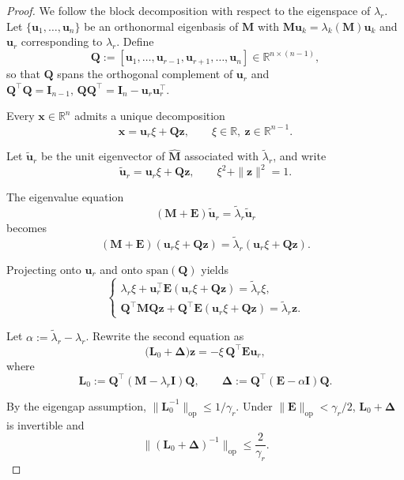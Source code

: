 \documentclass[10pt,a4paper]{amsart}
\newcommand{\op}{\mathrm{op}}
\begin{document}
\begin{proof}
We follow the block decomposition with respect to the eigenspace of $\lambda_r$.
Let $\{\mathbf{u}_1,\dots,\mathbf{u}_n\}$ be an orthonormal eigenbasis of $\mathbf{M}$ with
$\mathbf{M}\mathbf{u}_k=\lambda_k(\mathbf{M})\mathbf{u}_k$ and $\mathbf{u}_r$ corresponding to $\lambda_r$.
Define
\[
\mathbf{Q}
:=
[\mathbf{u}_1,\dots,\mathbf{u}_{r-1},\mathbf{u}_{r+1},\dots,\mathbf{u}_n]
\in \mathbb{R}^{n\times(n-1)},
\]
so that $\mathbf{Q}$ spans the orthogonal complement of $\mathbf{u}_r$ and
\(
\mathbf{Q}^\top \mathbf{Q}=\mathbf{I}_{n-1},
\,
\mathbf{Q}\mathbf{Q}^\top=\mathbf{I}_n-\mathbf{u}_r\mathbf{u}_r^\top.
\)

Every $\mathbf{x}\in\mathbb{R}^n$ admits a unique decomposition
\[
\mathbf{x}=\mathbf{u}_r\xi+\mathbf{Q}\mathbf{z},
\qquad
\xi\in\mathbb{R},\ \mathbf{z}\in\mathbb{R}^{n-1}.
\]

Let $\widetilde{\mathbf{u}}_r$ be the unit eigenvector of $\widehat{\mathbf{M}}$
associated with $\widetilde{\lambda}_r$, and write
\[
\widetilde{\mathbf{u}}_r=\mathbf{u}_r\xi+\mathbf{Q}\mathbf{z},
\qquad
\xi^2+\|\mathbf{z}\|^2=1.
\]

The eigenvalue equation
\[
(\mathbf{M}+\mathbf{E})\widetilde{\mathbf{u}}_r
=
\widetilde{\lambda}_r \widetilde{\mathbf{u}}_r
\]
becomes
\[
(\mathbf{M}+\mathbf{E})(\mathbf{u}_r\xi+\mathbf{Q}\mathbf{z})
=
\widetilde{\lambda}_r(\mathbf{u}_r\xi+\mathbf{Q}\mathbf{z}).
\]

Projecting onto $\mathbf{u}_r$ and onto $\text{span}(\mathbf{Q})$ yields
\[
\begin{cases}
\lambda_r\xi + \mathbf{u}_r^\top \mathbf{E}(\mathbf{u}_r\xi+\mathbf{Q}\mathbf{z})
= \widetilde{\lambda}_r \xi, \\[0.3em]
\mathbf{Q}^\top \mathbf{M}\mathbf{Q}\mathbf{z}
+ \mathbf{Q}^\top \mathbf{E}(\mathbf{u}_r\xi+\mathbf{Q}\mathbf{z})
= \widetilde{\lambda}_r \mathbf{z}.
\end{cases}
\]

Let $\alpha:=\widetilde{\lambda}_r-\lambda_r$.
Rewrite the second equation as
\[
\bigl(\mathbf{L}_0 + \mathbf{\Delta}\bigr)\mathbf{z}
=
-\xi\,\mathbf{Q}^\top\mathbf{E}\mathbf{u}_r,
\]
where
\[
\mathbf{L}_0 := \mathbf{Q}^\top(\mathbf{M}-\lambda_r\mathbf{I})\mathbf{Q},
\qquad
\mathbf{\Delta} := \mathbf{Q}^\top(\mathbf{E}-\alpha\mathbf{I})\mathbf{Q}.
\]

By the eigengap assumption, $\|\mathbf{L}_0^{-1}\|_{\op}\le 1/\gamma_r$.
Under $\|\mathbf{E}\|_{\op}<\gamma_r/2$,
$\mathbf{L}_0+\mathbf{\Delta}$ is invertible and
\[
\|(\mathbf{L}_0+\mathbf{\Delta})^{-1}\|_{\op}
\le \frac{2}{\gamma_r}.
\]


\end{proof}
\end{document}
